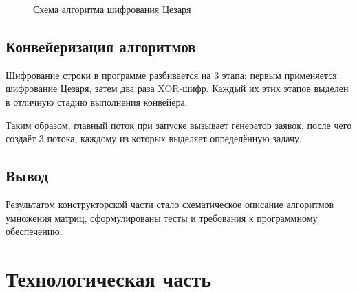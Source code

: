 \documentclass[12pt,a4paper]{report}
\begin{document}
\begin{figure}[h!]
    \caption{Схема алгоритма шифрования Цезаря}
    \label{fig:image}
\end{figure}

\section{Конвейеризация алгоритмов}

Шифрование строки в программе разбивается на 3 этапа: первым применяется шифрование Цезаря, затем два 
раза XOR-шифр. 
Каждый их этих этапов выделен в отличную стадию выполнения конвейера. 

Таким образом, главный поток при запуске вызывает генератор заявок, после чего создаёт 3 потока,
каждому из которых выделяет определённую задачу.

\section{Вывод}

Результатом конструкторской части стало схематическое описание алгоритмов умножения матриц, 
сформулированы тесты и требования к программному обеспечению.

\newpage
\chapter{Технологическая часть} 
\end{document}
